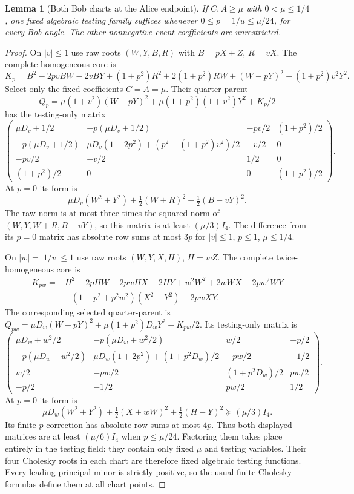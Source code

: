 \documentclass[11pt]{article}
\newtheorem{lemma}[theorem]{Lemma}
\begin{document}
\begin{lemma}[Both Bob charts at the Alice endpoint]\label{lem:endpoint}
If $C,A\ge\mu$ with $0<\mu\le1/4$, one fixed algebraic testing family
suffices whenever $0\le p=1/u\le\mu/24$, for every Bob angle.
The other nonnegative event coefficients are unrestricted.
\end{lemma}
\begin{proof}
On $|v|\le1$ use raw roots $(W,Y,B,R)$ with
$B=pX+Z$, $R=vX$. The complete homogeneous core is
\[
 K_p=B^2-2pvBW-2vBY+(1+p^2)R^2+2(1+p^2)RW
                       +(W-pY)^2+(1+p^2)v^2Y^2.
\]
Select only the fixed coefficients $C=A=\mu$. Their quarter-parent
\[
 Q_p=\mu(1+v^2)(W-pY)^2
          +\mu(1+p^2)(1+v^2)Y^2+K_p/2
\]
has the testing-only matrix
\[
 \begin{pmatrix}
 \mu D_v+1/2&-p(\mu D_v+1/2)&-pv/2&(1+p^2)/2\\
 -p(\mu D_v+1/2)&\mu D_v(1+2p^2)+(p^2+(1+p^2)v^2)/2&-v/2&0\\
 -pv/2&-v/2&1/2&0\\
 (1+p^2)/2&0&0&(1+p^2)/2
 \end{pmatrix}.
\]
At $p=0$ its form is
\[
 \mu D_v(W^2+Y^2)+\tfrac12(W+R)^2+\tfrac12(B-vY)^2.
\]
The raw norm is at most three times the squared norm of
$(W,Y,W+R,B-vY)$, so this matrix is at least $(\mu/3)I_4$.
The difference from its $p=0$ matrix has absolute row sums at most
$3p$ for $|v|\le1$, $p\le1$, $\mu\le1/4$.

On $|w|=|1/v|\le1$ use raw roots $(W,Y,X,H)$, $H=wZ$.
The complete twice-homogeneous core is
\begin{align*}
 K_{pw}={}&H^2-2pHW+2pwHX-2HY+w^2W^2+2wWX-2pw^2WY\\
 &+(1+p^2+p^2w^2)(X^2+Y^2)-2pwXY.
\end{align*}
The corresponding selected quarter-parent is
$Q_{pw}=\mu D_w(W-pY)^2+\mu(1+p^2)D_wY^2+K_{pw}/2$.
Its testing-only matrix is
\[
 \begin{pmatrix}
 \mu D_w+w^2/2&-p(\mu D_w+w^2/2)&w/2&-p/2\\
 -p(\mu D_w+w^2/2)&\mu D_w(1+2p^2)+(1+p^2D_w)/2&-pw/2&-1/2\\
 w/2&-pw/2&(1+p^2D_w)/2&pw/2\\
 -p/2&-1/2&pw/2&1/2
 \end{pmatrix}.
\]
At $p=0$ its form is
\[
 \mu D_w(W^2+Y^2)+\tfrac12(X+wW)^2+\tfrac12(H-Y)^2
                  \succeq(\mu/3)I_4.
\]
Its finite-$p$ correction has absolute row sums at most $4p$.
Thus both displayed matrices are at least $(\mu/6)I_4$ when
$p\le\mu/24$. Factoring them takes place entirely in the testing
field: they contain only fixed $\mu$ and testing variables.
Their four Cholesky roots in each chart are therefore fixed algebraic
testing functions. Every leading principal minor is strictly positive,
so the usual finite Cholesky formulas define them at all chart points.


\end{proof}
\end{document}
